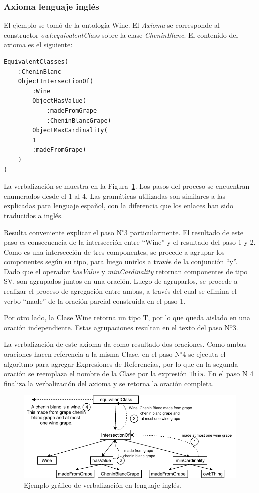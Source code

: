 \subsubsection{Axioma lenguaje inglés}
El ejemplo se tomó de la ontología Wine. El \textit{Axioma} se corresponde al constructor \emph{owl:equivalentClass} sobre la clase \emph{CheninBlanc}. El contenido del axioma es el siguiente: 

\begin{verbatim}
EquivalentClasses(
    :CheninBlanc
    ObjectIntersectionOf(
        :Wine
        ObjectHasValue(
            :madeFromGrape
            :CheninBlancGrape)
        ObjectMaxCardinality(
        1
        :madeFromGrape)
    )
)
\end{verbatim}
La verbalización se muestra en la Figura~\ref{fig:ejemplo_verb_ingles}.
Los pasos del proceso se encuentran enumerados desde el 1 al 4. Las gramáticas utilizadas son similares a las explicadas para lenguaje español, con la diferencia que los enlaces han sido traducidos a inglés.

Resulta conveniente explicar el paso N$^\circ$3 particularmente. El resultado de este paso es consecuencia de la intersección entre ``Wine'' y el resultado del paso 1 y 2. 
Como es una intersección de tres componentes, se procede a agrupar los componentes según su tipo, para luego unirlos a través de la conjunción ``y''. Dado que el operador \emph{hasValue} y \emph{minCardinality} retornan componentes de tipo SV, son agrupados juntos en una oración. Luego de agruparlos, se procede a realizar el proceso de agregación entre ambas, a través del cual se elimina el verbo ``made'' de la oración parcial construida en el paso 1. 

Por otro lado, la Clase Wine retorna un tipo T, por lo que queda aislado en una oración independiente. Estas agrupaciones resultan en el texto del paso Nº3.

La verbalización de este axioma da como resultado dos oraciones. Como ambas oraciones hacen referencia a la misma Clase, en el paso N$^\circ$4  se ejecuta el algoritmo para agregar Expresiones de Referencias, por lo que en la segunda oración se reemplaza el nombre de la Clase por la expresión \texttt{This}. En el paso N$^\circ$4 finaliza la verbalización del axioma y se retorna la oración completa.

\begin{figure}
    \centering
    \includegraphics[width=\textwidth]{img/generacion_documento/verbalizacion_equivalentClass_english.pdf}
    \caption{Ejemplo gráfico de verbalización en lenguaje inglés.}
    \label{fig:ejemplo_verb_ingles}
\end{figure}

